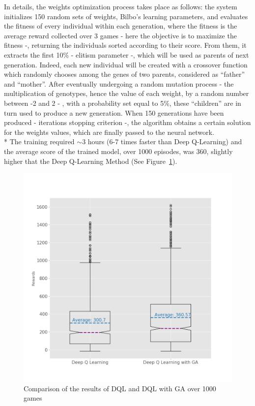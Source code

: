 In details, the weights optimization process takes place as follows: the system initializes 150 random sets of weights, Bilbo's learning parameters, and evaluates the fitness of every individual within each generation, where the fitness is the average reward collected over 3 games - here the objective is to maximize the fitness -, returning the individuals sorted according to their score. From them, it extracts the first 10\% - elitism parameter -, which will be used as parents of next generation. Indeed, each new individual will be created with a crossover function which randomly chooses among the genes of two parents, considered as ``father'' and ``mother''. After eventually undergoing a random mutation process - the multiplication of genotypes, hence the value of each weight, by a random number between -2 and 2 - , with a probability set equal to 5\%, these ``children'' are in turn used to produce a new generation. When 150 generations have been produced - iterations stopping criterion -, the algorithm obtains a certain solution for the weights values, which are finally passed to the neural network. \\*
The training required $\sim$3 hours (6-7 times faster than Deep Q-Learning) and the average score of the trained model, over 1000 episodes, was 360, slightly higher that the Deep Q-Learning Method (See Figure~\ref{fig:deep_vs_ga}).

\begin{figure}[!h]
	\vspace{-2cm}
	\includegraphics[width=\linewidth]{./figs/deep_vs_ga.png}
	\vspace{-1.5cm}
	\caption{Comparison of the results of DQL and DQL with GA over 1000 games}
	\label{fig:deep_vs_ga}
	\vspace{-0.5cm}
\end{figure}

